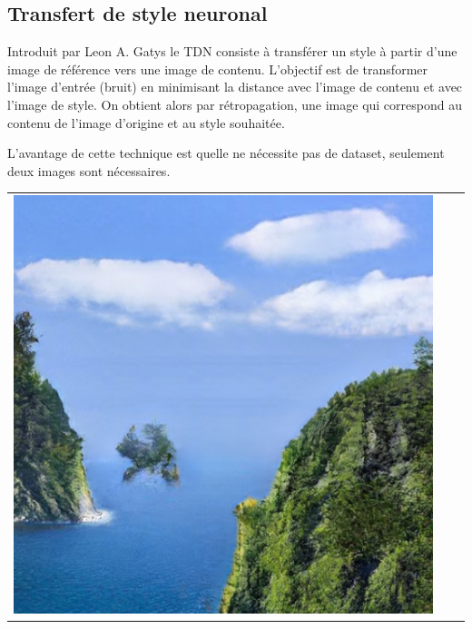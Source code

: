\documentclass[a4paper, 12pt]{report}
\begin{document}
\subsection{Transfert de style neuronal} 
Introduit par Leon A. Gatys \cite{DBLP:journals/corr/GatysEB15a} le TDN consiste à transférer un style à partir d'une image de référence vers une image de contenu. L'objectif est de transformer l'image d'entrée (bruit) en minimisant la distance avec l'image de contenu et avec l'image de style. On obtient alors par rétropagation, une image qui correspond au contenu de l'image d'origine et au style souhaitée.

L'avantage de cette technique est quelle ne nécessite pas de dataset, seulement deux images sont nécessaires.

\begin{center}
  \centering
  \begin{tabular}{ccc}
    \includegraphics[height=0.15\textheight]{images/test-gaugan.jpg}&

\end{tabular}
\end{center}
\end{document}
